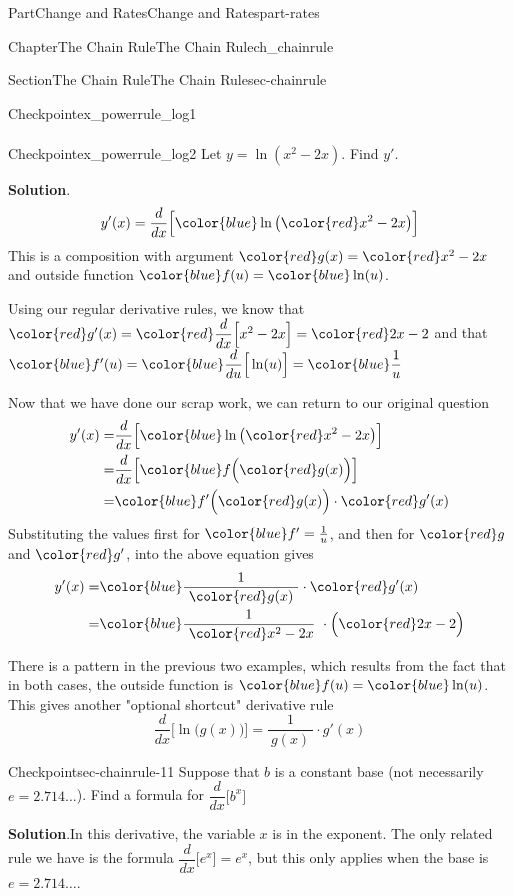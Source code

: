 \documentclass{tufte-book}
\newcommand{\blocktitlefont}{\relax}
\numberwithin{equation}{chapter}
\newcommand{\red}[1]{   {\color{red}   #1}   }
\newcommand{\blue}[1]{  {\color{blue}  #1}  }
\newcommand{\ddx}[1]{ \dfrac{d}{dx} \Big[ #1 \Big]  }
\newcommand{\ddu}[1]{ \dfrac{d}{du} \Big[ #1 \Big]  }
\newcommand{\amp}{&}
\begin{document}
\begin{partptx}{Part}{Change and Rates}{}{Change and Rates}{}{}{part-rates}
\begin{chapterptx}{Chapter}{The Chain Rule}{}{The Chain Rule}{}{}{ch_chainrule}
\begin{sectionptx}{Section}{The Chain Rule}{}{The Chain Rule}{}{}{sec-chainrule}
\begin{inlineexercise}{Checkpoint}{}{ex_powerrule_log1}
\begin{align*}
\end{align*}
%
\end{inlineexercise}%
\begin{inlineexercise}{Checkpoint}{}{ex_powerrule_log2}%
Let \(y = \ln( x^2- 2x)\).  Find \(y'\).%
\par\smallskip%
\noindent\textbf{\blocktitlefont Solution}.\hypertarget{ex_powerrule_log2-2}{}\quad{}%
\begin{equation*}
y'(x) = \ddx{ \blue{ \ln\big( \red{x^2- 2x} \big) } }
\end{equation*}
This is a composition with argument \(\red{g(x)} = \red{x^2- 2x}\) and outside function \(\blue{f(u)} = \blue{ \ln(u) }\).%
\par
Using our regular derivative rules, we know that \(\red{g'(x)} 
= \red{ \ddx{x^2- 2x} } = \red{2x-2} \) and that \(\blue{f'(u)} 
= \blue{\ddu{ \ln(u) }} = \blue{\dfrac{1}{u}} \)%
\par
Now that we have done our scrap work, we can return to our original question%
\begin{align*}
y'(x) = \amp 
\ddx{\blue{ \ln\big(\red{x^2- 2x}\big) } }  \\
= \amp \ddx{ \blue{f\Big( \red{g(x)} \Big) } }\\
= \amp \blue{f'\Big( \red{g(x)}\Big)}\cdot \red{g'(x)}
\end{align*}
Substituting the values first for \(\blue{f'}= \frac{1}{u}\), and then for  \(\red{g}\) and \(\red{g'}\), into the above equation gives%
\begin{align*}
y'(x) = \amp 
\blue{ \frac{1}{\ \red{g(x)}\ } }\cdot \red{g'(x)}\\
= \amp 
\blue{ \frac{1}{\ \red{x^2- 2x}}\ }\cdot \Big(\red{2x-2}\Big)
\end{align*}
%
\end{inlineexercise}%
There is a pattern in the previous two examples, which results from the fact that in both cases, the outside function is \(\blue{f(u)} = \blue{\ln(u)}\).  This gives another "optional shortcut" derivative rule%
\begin{equation*}
\ddx{\ln\Big( g(x) \Big)} = \dfrac{1}{\ g(x)\ }\cdot g'(x)
\end{equation*}
%
\begin{inlineexercise}{Checkpoint}{}{sec-chainrule-11}%
Suppose that \(b\) is a constant base (not necessarily \(e=2.714\dots\)). Find a formula for \(\displaystyle\ddx{ b^x } \)%
\par\smallskip%
\noindent\textbf{\blocktitlefont Solution}.\hypertarget{sec-chainrule-11-2}{}\quad{}In this derivative, the variable \(x\) is in the exponent. The only related rule we have is the formula \(\ddx{e^x}=e^x\), but this only applies when the base is \(e=2.714\dots\).%

\end{inlineexercise}
\end{sectionptx}
\end{chapterptx}
\end{partptx}
\end{document}
